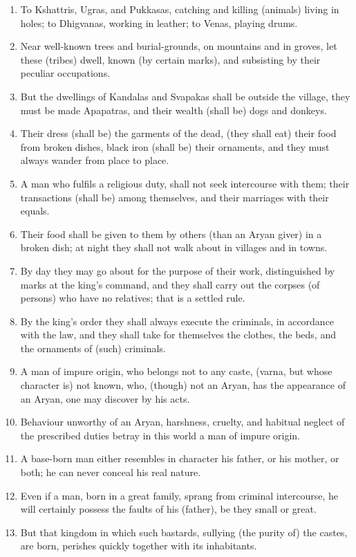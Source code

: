 \begin{enumerate}
\item To Kshattris, Ugras, and Pukkasas, catching and killing (animals) living in holes; to Dhigvanas, working in leather; to Venas, playing drums.
\item Near well-known trees and burial-grounds, on mountains and in groves, let these (tribes) dwell, known (by certain marks), and subsisting by their peculiar occupations.
\item But the dwellings of Kandalas and Svapakas shall be outside the village, they must be made Apapatras, and their wealth (shall be) dogs and donkeys.
\item Their dress (shall be) the garments of the dead, (they shall eat) their food from broken dishes, black iron (shall be) their ornaments, and they must always wander from place to place.
\item A man who fulfils a religious duty, shall not seek intercourse with them; their transactions (shall be) among themselves, and their marriages with their equals.
\item Their food shall be given to them by others (than an Aryan giver) in a broken dish; at night they shall not walk about in villages and in towns.
\item By day they may go about for the purpose of their work, distinguished by marks at the king's command, and they shall carry out the corpses (of persons) who have no relatives; that is a settled rule.
\item By the king's order they shall always execute the criminals, in accordance with the law, and they shall take for themselves the clothes, the beds, and the ornaments of (such) criminals.
\item A man of impure origin, who belongs not to any caste, (varna, but whose character is) not known, who, (though) not an Aryan, has the appearance of an Aryan, one may discover by his acts.
\item Behaviour unworthy of an Aryan, harshness, cruelty, and habitual neglect of the prescribed duties betray in this world a man of impure origin.
\item A base-born man either resembles in character his father, or his mother, or both; he can never conceal his real nature.
\item Even if a man, born in a great family, sprang from criminal intercourse, he will certainly possess the faults of his (father), be they small or great.
\item But that kingdom in which such bastards, sullying (the purity of) the castes, are born, perishes quickly together with its inhabitants.

\end{enumerate}
